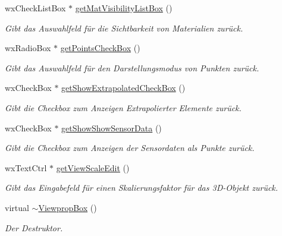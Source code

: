 \begin{DoxyCompactItemize}
wx\-Check\-List\-Box $\ast$ \hyperlink{classViewpropBox_a3b9cdaefd86124fd67e821dfa0bbd3b8}{get\-Mat\-Visibility\-List\-Box} ()
\begin{DoxyCompactList}\small\item\em Gibt das Auswahlfeld für die Sichtbarkeit von Materialien zurück. \end{DoxyCompactList}\item 
wx\-Radio\-Box $\ast$ \hyperlink{classViewpropBox_a1b74032daa1c60624755396d7afc9d0d}{get\-Points\-Check\-Box} ()
\begin{DoxyCompactList}\small\item\em Gibt das Auswahlfeld für den Darstellungsmodus von Punkten zurück. \end{DoxyCompactList}\item 
wx\-Check\-Box $\ast$ \hyperlink{classViewpropBox_a3d3c4a809f14eca31ccf3858033eee7a}{get\-Show\-Extrapolated\-Check\-Box} ()
\begin{DoxyCompactList}\small\item\em Gibt die Checkbox zum Anzeigen Extrapolierter Elemente zurück. \end{DoxyCompactList}\item 
wx\-Check\-Box $\ast$ \hyperlink{classViewpropBox_ade722440c4b3c0da3feb78a590aa2946}{get\-Show\-Show\-Sensor\-Data} ()
\begin{DoxyCompactList}\small\item\em Gibt die Checkbox zum Anzeigen der Sensordaten als Punkte zurück. \end{DoxyCompactList}\item 
wx\-Text\-Ctrl $\ast$ \hyperlink{classViewpropBox_a8ac6322e5dcdbbde1c646e1ccbf08ed9}{get\-View\-Scale\-Edit} ()
\begin{DoxyCompactList}\small\item\em Gibt das Eingabefeld für einen Skalierungsfaktor für das 3\-D-\/\-Objekt zurück. \end{DoxyCompactList}\item 
virtual \hyperlink{classViewpropBox_ab1c9234649b6a386b457d9ba5de311e4}{$\sim$\-Viewprop\-Box} ()
\begin{DoxyCompactList}\small\item\em Der Destruktor. \end{DoxyCompactList}\end{DoxyCompactItemize}
